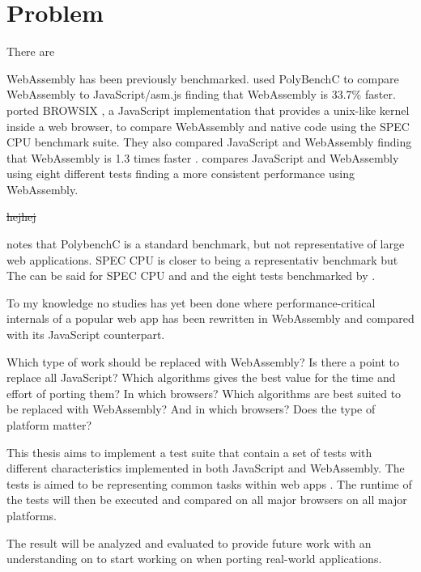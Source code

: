 \section{Problem}
\label{problem}

There are 

WebAssembly has been previously benchmarked. \textcite{HaasRossbergSchuffTitzerHolmanGohmanWagnerZakaiBastien2017} used PolyBenchC to compare WebAssembly to JavaScript/asm.js finding that WebAssembly is 33.7\% faster. \textcite{JangdaPowersGuhaBerger2019} ported BROWSIX \parencite{PowersVilkBerger2017}, a JavaScript implementation that provides a unix-like kernel inside a web browser, to compare WebAssembly and native code using the SPEC CPU benchmark suite. They also compared JavaScript and WebAssembly finding that WebAssembly is 1.3 times faster \parencite{JangdaPowersGuhaBerger2019}. \textcite{ReiserBlaser2017} compares JavaScript and WebAssembly using eight different tests \parencite[Table 1 in][]{ReiserBlaser2017} finding a more consistent performance using WebAssembly.

\st{hejhej}

\textcite{JangdaPowersGuhaBerger2019} notes that PolybenchC is a standard benchmark, but not representative of large web applications. SPEC CPU is closer to being a representativ benchmark but 
The can be said for SPEC CPU and and the eight tests benchmarked by \textcite{ReiserBlaser2017}.

To my knowledge no studies has yet been done where performance-critical internals of a popular web app has been rewritten in WebAssembly and compared with its JavaScript counterpart. 

Which type of work should be replaced with WebAssembly? Is there a point to replace all JavaScript?
Which algorithms gives the best value for the time and effort of porting them? In which browsers?
Which algorithms are best suited to be replaced with WebAssembly? And in which browsers? Does the type of platform matter?

This thesis aims to implement a test suite that contain a set of tests with different characteristics implemented in both JavaScript and WebAssembly. The tests is aimed to be representing common tasks within web apps \parencite{WohlinRunesonHostOhlssonRegnellWesslen2012}.
The runtime of the tests will then be executed and compared on all major browsers on all major platforms.

The result will be analyzed and evaluated to provide future work with an understanding on to start working on when porting real-world applications.

